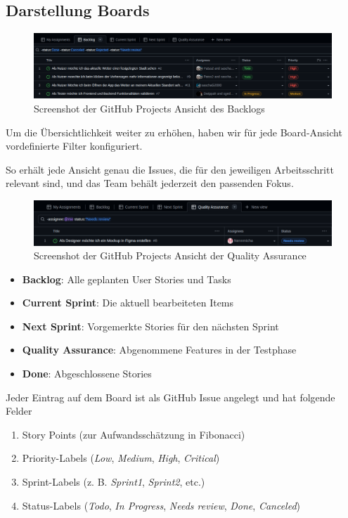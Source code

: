 \documentclass{article}
\begin{document}
\subsection{Darstellung Boards}
\begin{figure}[h]
  \caption{Screenshot der GitHub Projects Ansicht des Backlogs}
  \centering
  \includegraphics[width=\textwidth]{backlog.png}
\end{figure}

Um die Übersichtlichkeit weiter zu erhöhen, haben wir für jede Board-Ansicht vordefinierte Filter konfiguriert.

So erhält jede Ansicht genau die Issues, die für den jeweiligen Arbeitsschritt relevant sind, und das Team behält jederzeit den passenden Fokus.

\begin{figure}[h]
  \caption{Screenshot der GitHub Projects Ansicht der Quality Assurance}
  \centering
  \includegraphics[width=\textwidth]{quality_assurance.png}
\end{figure}

\begin{itemize}
  \item \textbf{Backlog}: Alle geplanten User Stories und Tasks
  \item \textbf{Current Sprint}: Die aktuell bearbeiteten Items
  \item \textbf{Next Sprint}: Vorgemerkte Stories für den nächsten Sprint
  \item \textbf{Quality Assurance}: Abgenommene Features in der Testphase
  \item \textbf{Done}: Abgeschlossene Stories
\end{itemize}

Jeder Eintrag auf dem Board ist als GitHub Issue angelegt und hat folgende Felder
	
\begin{enumerate}
  \item Story Points (zur Aufwandsschätzung in Fibonacci)
  \item Priority-Labels (\textit{Low}, \textit{Medium}, \textit{High}, \textit{Critical})
  \item Sprint-Labels (z. B. \textit{Sprint1}, \textit{Sprint2}, etc.)
  \item Status-Labels (\textit{Todo}, \textit{In Progress}, \textit{Needs review}, \textit{Done}, \textit{Canceled})
\end{enumerate}
\end{document}
